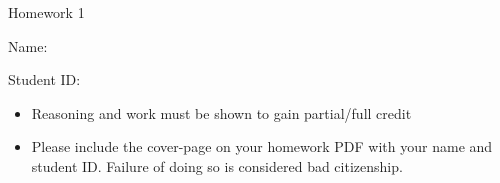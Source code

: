 \documentclass[11pt]{exam}
\begin{document}
\centerline{\Large \sc Homework 1}
\pagestyle{empty}

\hrulefill

\vspace{2cm}


{\Large \sc Name:}



\vspace{2cm}



{\Large \sc Student ID:}

\vspace{6cm}

\begin{itemize}
  \item Reasoning and work must be shown to gain partial/full
  credit
  \item Please include the cover-page on your homework PDF with your name and student ID. Failure of doing so is considered bad citizenship. 

 \end{itemize}
\end{document}
